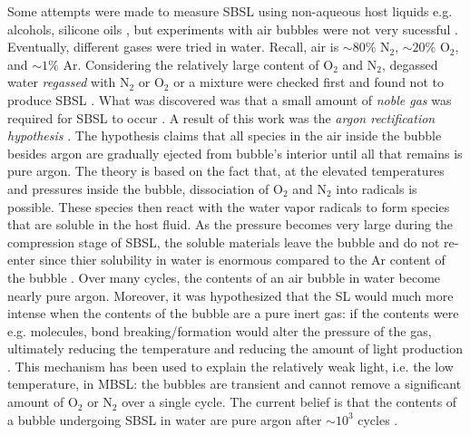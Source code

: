 \documentclass[rmp,aps,nofootinbib,superscriptaddress,floatfix]{revtex4-2}
\begin{document}
Some attempts were made to measure SBSL using non-aqueous host liquids e.g. alcohols, silicone oils \cite{weninger1995sonoluminescence,barber1997defining}, but experiments with air bubbles were not very sucessful \cite{barber1997defining}. Eventually, different gases were tried in water. Recall, air is $\sim 80\%$ N$_2$, $\sim 20\%$ O$_2$, and $\sim 1\% $ Ar. Considering the relatively large content of O$_2$ and N$_2$, degassed water \emph{regassed} with N$_2$ or O$_2$ or a mixture were checked first and found not to produce SBSL \cite{hiller1994effect}. What was discovered was that a small amount of \emph{noble gas} was required for SBSL to occur \cite{barber1997defining,hiller1994effect,brenner2002single}. A result of this work was the \emph{argon rectification hypothesis} \cite{lohse1997sonoluminescing,brenner2002single,yasui2018acoustic,suslick2008inside}. The hypothesis claims that all species in the air inside the bubble besides argon are gradually ejected from bubble's interior until all that remains is pure argon. The theory is based on the fact that, at the elevated temperatures and pressures inside the bubble, dissociation of O$_2$ and N$_2$ into radicals is possible. These species then react with the water vapor radicals to form species that are soluble in the host fluid. As the pressure becomes very large during the compression stage of SBSL, the soluble materials leave the bubble and do not re-enter since thier solubility in water is enormous compared to the Ar content of the bubble \cite{lohse1997sonoluminescing}. Over many cycles, the contents of an air bubble in water become nearly pure argon. Moreover, it was hypothesized that the SL would much more intense when the contents of the bubble are a pure inert gas: if the contents were e.g. molecules, bond breaking/formation would alter the pressure of the gas, ultimately reducing the temperature and reducing the amount of light production \cite{brenner2002single,yasui2018acoustic,lohse2018bubble,suslick2008inside}. This mechanism has been used to explain the relatively weak light, i.e. the low temperature, in MBSL: the bubbles are transient and cannot remove a significant amount of O$_2$ or N$_2$ over a single cycle. The current belief is that the contents of a bubble undergoing SBSL in water are pure argon after $\sim 10^3$ cycles \cite{brenner2002single,yasui2018acoustic}. 
\end{document}
